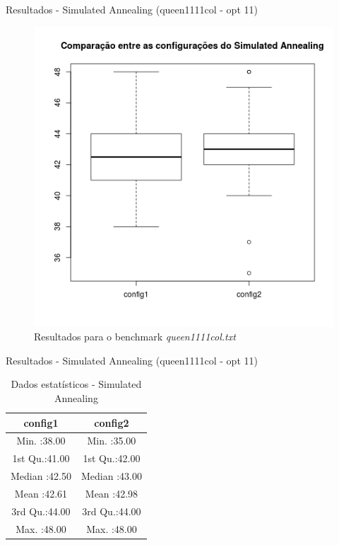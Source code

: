 \documentclass[compress, hide notes]{beamer}
\begin{document}
        \begin{frame}{Resultados - Simulated Annealing (queen1111col - opt 11)}
        
        	\begin{figure}[H]
			\centering
            \label{fig:sol-sa-queen1111col}
            \includegraphics[width=0.6\linewidth]{img/sa-sol-queen1111col.png}
            \caption[Resultados para o benchmark queen1111col.txt]{Resultados para o benchmark \textit{queen1111col.txt}}
			\end{figure}

		\end{frame}
        
        \begin{frame}{Resultados - Simulated Annealing (queen1111col - opt 11)}
        
        	\begin{table}[H]
            \centering
              \begin{tabular}{c|c}
               \textbf{config1}       &  \textbf{config2}                        \\ \hline \hline
               Min.   :38.00 &          Min.   :35.00          \\ \hline
               1st Qu.:41.00 &          1st Qu.:42.00          \\ \hline
               Median :42.50 &          Median :43.00          \\ \hline
               Mean   :42.61 &          Mean   :42.98          \\ \hline
               3rd Qu.:44.00 &          3rd Qu.:44.00          \\ \hline
               Max.   :48.00 &          Max.   :48.00          \\
              \end{tabular}
              \caption {Dados estatísticos - Simulated Annealing}
        	\end{table}


		\end{frame}
        
\end{document}

